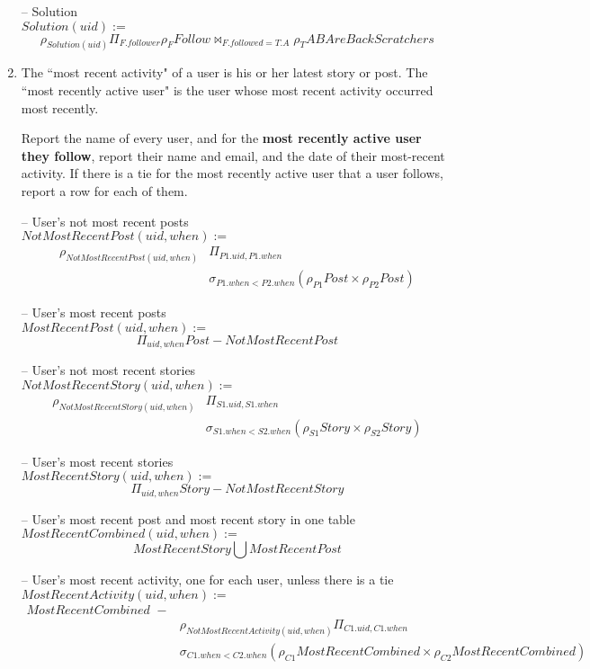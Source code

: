 \documentclass{article}
\newcommand{\var}[1]{\mathit{#1}}
\begin{document}
\begin{enumerate}
{-- Solution \\
$\var{Solution}(uid) :=$
\[
    \rho_{\var{Solution}(uid)}
    \Pi_{F.follower}
    \rho_{F} \var{Follow} \bowtie_{F.followed=T.A} \rho_{T} \var{ABAreBackScratchers}
\]


}
\item   %
The ``most recent activity" of a user is his or her latest story or post. 
The ``most recently active user" is the user whose most recent activity
occurred most recently.

Report the name of every user, 
and for the \textbf{most recently active user they follow},
report their name and email, and the date of their most-recent activity.
If there is a tie for the most recently active user that a user follows,
report a row for each of them.


{\large  


-- User's not most recent posts \\
$\var{NotMostRecentPost}(uid, when) :=$
\begin{align*}
    \rho_{\var{NotMostRecentPost}(uid, when)}
    &\Pi_{P1.uid, P1.when}\\
    &\sigma_{P1.when < P2.when}
    \left( 
        \rho_{P1} \var{Post} \times \rho_{P2} \var{Post}
    \right)
\end{align*}

-- User's most recent posts \\ 
$\var{MostRecentPost}(uid, when) :=$
\[
    \Pi_{uid, when} \var{Post} - \var{NotMostRecentPost}
\]


-- User's not most recent stories \\ 
$\var{NotMostRecentStory}(uid, when) :=$
\begin{align*}
    \rho_{\var{NotMostRecentStory}(uid, when)}
    &\Pi_{S1.uid, S1.when}\\
    &\sigma_{S1.when < S2.when}
    \left( 
        \rho_{S1} \var{Story} \times \rho_{S2} \var{Story}
    \right)
\end{align*}

-- User's most recent stories \\ 
$\var{MostRecentStory}(uid, when) :=$
\[
    \Pi_{uid, when} \var{Story} - \var{NotMostRecentStory}
\]


-- User's most recent post and most recent story in one table  \\ 
$\var{MostRecentCombined}(uid, when) :=$
\[
    \var{MostRecentStory} \bigcup \var{MostRecentPost}  
\]

-- User's most recent activity, one for each user, unless there is a tie \\ 
$\var{MostRecentActivity}(uid, when) :=$
\begin{align*}
    \var{MostRecentCombined} \,\,- &\\ 
    &\rho_{\var{NotMostRecentActivity}(uid, when)} \Pi_{C1.uid, C1.when} \\
    &\sigma_{C1.when < C2.when} 
        (\rho_{C1}\var{MostRecentCombined} \times \rho_{C2}\var{MostRecentCombined})
\end{align*}


}
\end{enumerate}
\end{document}
